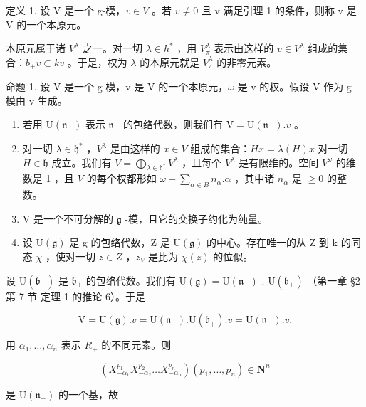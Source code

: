 定义 1. 设 V 是一个 g-模，\(v \in V\) 。若 \(v \neq 0\) 且 v 满足引理 1 的条件，则称 v 是 V 的一个本原元。

本原元属于诸 \(V^{\lambda}\) 之一。对一切 \(\lambda\in h^{*}\) ，用 \(V_{\pi}^{\lambda}\) 表示由这样的 \(v\in V^{\lambda}\) 组成的集合：\(b_{+}v\subset kv\) 。于是，权为 \(\lambda\) 的本原元就是 \(V_{\pi}^{\lambda}\) 的非零元素。

命题 1. 设 V 是一个 g-模，v 是 V 的一个本原元，\(\omega\) 是 v 的权。假设 V 作为 g-模由 v 生成。

\begin{enumerate}
\def\labelenumi{(\roman{enumi})}
\item
  若用 \(\mathrm{U}(\mathfrak{n}_{-})\) 表示 \(\mathfrak{n}_{-}\) 的包络代数，则我们有 \(\mathrm{V} = \mathrm{U}(\mathfrak{n}_{-}).v\) 。
\item
  对一切 \(\lambda \in \mathfrak{h}^*\) ，\(V^{\lambda}\) 是由这样的 \(x \in V\) 组成的集合：\(Hx = \lambda(H)x\) 对一切 \(H \in \mathfrak{h}\) 成立。我们有 \(V = \bigoplus_{\lambda \in \mathfrak{h}^*} V^{\lambda}\) ，且每个 \(V^{\lambda}\) 是有限维的。空间 \(V^{\omega}\) 的维数是 1 ，且 \(V\) 的每个权都形如 \(\omega - \sum_{\alpha \in B} n_{\alpha}. \alpha\) ，其中诸 \(n_{\alpha}\) 是 \(\geq 0\) 的整数。
\item
  V 是一个不可分解的 \(\mathfrak{g}\) -模，且它的交换子约化为纯量。
\item
  设 \(\mathrm{U}(\mathfrak{g})\) 是 g 的包络代数，Z 是 \(\mathrm{U}(\mathfrak{g})\) 的中心。存在唯一的从 Z 到 k 的同态 \(\chi\) ，使对一切 \(z \in Z\) ，\(z_{V}\) 是比为 \(\chi(z)\) 的位似。
\end{enumerate}

设 \(\mathrm{U}(\mathfrak{b}_{+})\) 是 \(\mathfrak{b}_{+}\) 的包络代数。我们有 \(\mathrm{U}(\mathfrak{g}) = \mathrm{U}(\mathfrak{n}_{-})\) . \(\mathrm{U}(\mathfrak{b}_{+})\) （第一章 §2 第 7 节 定理 1 的推论 6）。于是

\[
\mathrm{V} = \mathrm{U} (\mathfrak {g}). v = \mathrm{U} (\mathfrak {n} _ {-}). \mathrm{U} (\mathfrak {b} _ {+}). v = \mathrm{U} (\mathfrak {n} _ {-}). v.
\]

用 \(\alpha_{1},\ldots,\alpha_{n}\) 表示 \(R_{+}\) 的不同元素。则

\[
\left(X _ {- \alpha_ {1}} ^ {p _ {1}} X _ {- \alpha_ {2}} ^ {p _ {2}} \dots X _ {- \alpha_ {n}} ^ {p _ {n}}\right) (p _ {1}, \ldots , p _ {n}) \in \mathbf {N} ^ {n}
\]

是 \(\mathrm{U}(\mathfrak{n}_{-})\) 的一个基，故

